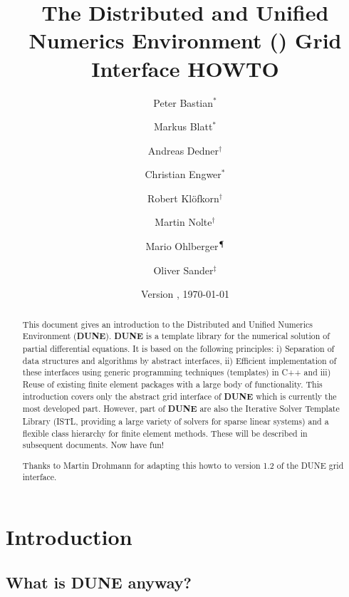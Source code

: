 \documentclass[11pt,a4paper,headinclude,footinclude,DIV16,headings=normal]{scrreprt}
\title{The Distributed and Unified Numerics Environment (\Dune{}) Grid
  Interface HOWTO}
\author{Peter Bastian$^\ast$ \and
Markus Blatt$^\ast$ \and
Andreas Dedner$^\dagger$ \and
Christian Engwer$^\ast$ \and
Robert Kl\"ofkorn$^\dagger$ \and
Martin Nolte$^\dagger$ \and
Mario Ohlberger$^\mathparagraph$ \and
Oliver Sander$^\ddagger$}
\date{Version \version, \today}
\newcommand{\Dune}{{\sffamily\bfseries DUNE}\xspace}
\begin{document}
\maketitle

\begin{abstract}
This document gives an introduction to the Distributed and Unified
Numerics Environment (\Dune). \Dune{} is a template library for the
numerical solution of partial differential equations. It is based on
the following principles: i) Separation of data structures and
algorithms by abstract interfaces, ii) Efficient implementation of these
interfaces using generic programming techniques (templates) in C++ and
iii) Reuse of existing finite element packages with a large body of
functionality. This introduction covers only the abstract grid interface
of \Dune{} which is currently the most developed part. However, part of
\Dune{} are also the Iterative Solver Template Library (ISTL, providing a
large variety of solvers for sparse linear systems) and a flexible class
hierarchy for finite element methods. These will be described in
subsequent documents. Now have fun!

\vspace*{\fill}
Thanks to Martin Drohmann for adapting this howto to version 1.2 of the
DUNE grid interface.
\end{abstract}

\tableofcontents


\chapter{Introduction}

\section{What is \texorpdfstring{\Dune{}}{DUNE} anyway?}
\end{document}

